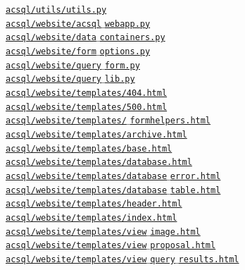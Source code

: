 \documentclass[10pt,journal,compsoc]{IEEEtran}
\begin{document}
\noindent \hyperlink{page.1}{\texttt{acsql/utils/utils.py}} \\
\noindent \hyperlink{page.1}{\texttt{acsql/website/acsql$\_$webapp.py}} \\
\noindent \hyperlink{page.1}{\texttt{acsql/website/data$\_$containers.py}} \\
\noindent \hyperlink{page.1}{\texttt{acsql/website/form$\_$options.py}} \\
\noindent \hyperlink{page.1}{\texttt{acsql/website/query$\_$form.py}} \\
\noindent \hyperlink{page.1}{\texttt{acsql/website/query$\_$lib.py}} \\
\noindent \hyperlink{page.1}{\texttt{acsql/website/templates/404.html}} \\
\noindent \hyperlink{page.1}{\texttt{acsql/website/templates/500.html}} \\
\noindent \hyperlink{page.1}{\texttt{acsql/website/templates/$\_$formhelpers.html}} \\
\noindent \hyperlink{page.1}{\texttt{acsql/website/templates/archive.html}} \\
\noindent \hyperlink{page.1}{\texttt{acsql/website/templates/base.html}} \\
\noindent \hyperlink{page.1}{\texttt{acsql/website/templates/database.html}} \\
\noindent \hyperlink{page.1}{\texttt{acsql/website/templates/database$\_$error.html}} \\
\noindent \hyperlink{page.1}{\texttt{acsql/website/templates/database$\_$table.html}} \\
\noindent \hyperlink{page.1}{\texttt{acsql/website/templates/header.html}} \\
\noindent \hyperlink{page.1}{\texttt{acsql/website/templates/index.html}} \\
\noindent \hyperlink{page.1}{\texttt{acsql/website/templates/view$\_$image.html}} \\
\noindent \hyperlink{page.1}{\texttt{acsql/website/templates/view$\_$proposal.html}} \\
\noindent \hyperlink{page.1}{\texttt{acsql/website/templates/view$\_$query$\_$results.html}} \\

\newpage
\end{document}
